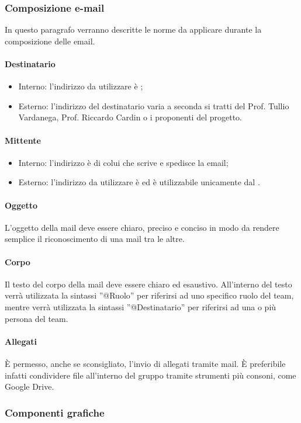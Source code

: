 \subsubsection{Composizione e-mail}
In questo paragrafo verranno descritte le norme da applicare durante la 
composizione delle email.
\paragraph{Destinatario}
\begin{itemize}
  \item Interno: l'indirizzo da utilizzare è \textit{\email};
  \item Esterno: l'indirizzo del destinatario varia a seconda si tratti del 
  Prof. Tullio Vardanega, Prof. Riccardo Cardin o i proponenti del progetto.
\end{itemize}
\paragraph{Mittente}
\begin{itemize}
  \item Interno: l'indirizzo è di colui che scrive e spedisce la email;
  \item Esterno: l'indirizzo da utilizzare è \textit{\email} ed è utilizzabile 
  unicamente dal \textit{\RdP}.
\end{itemize}
\paragraph{Oggetto}
L'oggetto della mail deve essere chiaro, preciso e conciso in modo da rendere 
semplice il riconoscimento di una mail tra le altre.
\paragraph{Corpo}
Il testo del corpo della mail deve essere chiaro ed esaustivo. All'interno del 
testo verrà utilizzata la sintassi ''@Ruolo'' per riferirsi ad uno specifico 
ruolo del team, mentre verrà utilizzata la sintassi ''@Destinatario'' per 
riferirsi ad una o più persona del team.
\paragraph{Allegati}
È permesso, anche se sconsigliato, l'invio di allegati tramite mail. È 
preferibile infatti condividere file all'interno del gruppo tramite strumenti più consoni, come Google 
Drive. 
\subsubsection{Componenti grafiche}
